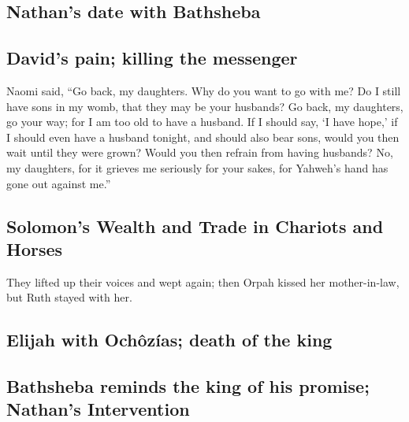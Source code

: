 \hypertarget{nathans-date-with-bathsheba}{%
\subsection{Nathan's date with
Bathsheba}\label{nathans-date-with-bathsheba}}

\hypertarget{davids-pain-killing-the-messenger}{%
\subsection{David's pain; killing the
messenger}\label{davids-pain-killing-the-messenger}}

 Naomi said, ``Go back, my daughters. Why do you want to
go with me? Do I still have sons in my womb, that they may be your
husbands?  Go back, my daughters, go your way; for I am
too old to have a husband. If I should say, `I have hope,' if I should
even have a husband tonight, and should also bear sons, 
would you then wait until they were grown? Would you then refrain from
having husbands? No, my daughters, for it grieves me seriously for your
sakes, for Yahweh's hand has gone out against me.''

\hypertarget{solomons-wealth-and-trade-in-chariots-and-horses}{%
\subsection{Solomon's Wealth and Trade in Chariots and
Horses}\label{solomons-wealth-and-trade-in-chariots-and-horses}}

 They lifted up their voices and wept again; then Orpah
kissed her mother-in-law, but Ruth stayed with her.

\hypertarget{elijah-with-ochuxf4zuxedas-death-of-the-king}{%
\subsection{Elijah with Ochôzías; death of the
king}\label{elijah-with-ochuxf4zuxedas-death-of-the-king}}

\hypertarget{bathsheba-reminds-the-king-of-his-promise-nathans-intervention}{%
\subsection{Bathsheba reminds the king of his promise; Nathan's
Intervention}\label{bathsheba-reminds-the-king-of-his-promise-nathans-intervention}}

